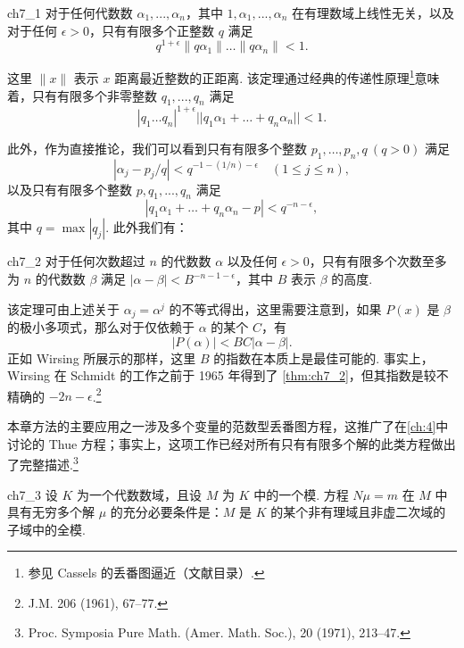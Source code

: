 \begin{mythm}{}{ch7_1}
对于任何代数数 $\alpha_1, ..., \alpha_n$，其中 $1, \alpha_1, ..., \alpha_n$ 在有理数域上线性无关，以及对于任何 $\epsilon > 0$，只有有限多个正整数 $q$ 满足
\[q^{1+\epsilon}\|q\alpha_1\|\dots\|q\alpha_n\|<1.\]
\end{mythm}

这里 $\|x\|$ 表示 $x$ 距离最近整数的正距离. 该定理通过经典的传递性原理\footnote{参见 Cassels 的丢番图逼近（文献目录）.}意味着，只有有限多个非零整数 $q_1, ..., q_n$ 满足
\[|q_1 \dots q_n|^{1+\epsilon} ||q_1 \alpha_1 + \dots + q_n \alpha_n|| < 1.\]

此外，作为直接推论，我们可以看到只有有限多个整数 $p_1, \ldots, p_n, q \ (q > 0)$ 满足
\[|\alpha_j - p_j/q| < q^{-1-(1/n)-\epsilon} \quad (1 \leqslant j \leqslant n),\]
以及只有有限多个整数 $p, q_1, ..., q_n$ 满足
\[|q_1\alpha_1+\ldots+q_n\alpha_n-p|< q^{-n-\epsilon},\]
其中 $q = \max |q_j|$. 此外我们有：

\begin{mythm}{}{ch7_2}
对于任何次数超过 $n$ 的代数数 $\alpha$ 以及任何 $\epsilon > 0$，只有有限多个次数至多为 $n$ 的代数数 $\beta$ 满足 $|\alpha - \beta| < B^{-n-1-\epsilon}$，其中 $B$ 表示 $\beta$ 的高度.
\end{mythm}

该定理可由上述关于 $\alpha_j = \alpha^j$ 的不等式得出，这里需要注意到，如果 $P(x)$ 是 $\beta$ 的极小多项式，那么对于仅依赖于 $\alpha$ 的某个 $C$，有
\[|P(\alpha)| < BC|\alpha - \beta|.\]
正如 Wirsing 所展示的那样，这里 $B$ 的指数在本质上是最佳可能的. 事实上，Wirsing 在 Schmidt 的工作之前于 1965 年得到了 \autoref{thm:ch7_2}，但其指数是较不精确的 $-2n - \epsilon$.\footnote{J.M. 206 (1961), 67--77.}

本章方法的主要应用之一涉及多个变量的范数型丢番图方程，这推广了在\autoref{ch:4}中讨论的 Thue 方程；事实上，这项工作已经对所有只有有限多个解的此类方程做出了完整描述.\footnote{Proc. Symposia Pure Math. (Amer. Math. Soc.), 20 (1971), 213--47.}

\begin{mythm}{}{ch7_3}
设 $K$ 为一个代数数域，且设 $M$ 为 $K$ 中的一个模. 方程 $N\mu = m$ 在 $M$ 中具有无穷多个解 $\mu$ 的充分必要条件是：$M$ 是 $K$ 的某个非有理域且非虚二次域的子域中的全模.
\end{mythm}

